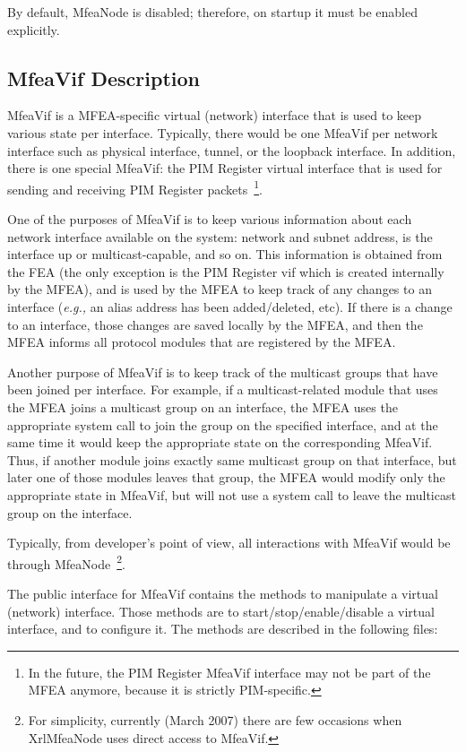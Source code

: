 \documentclass[11pt]{article}
\newcommand{\eg}{\emph{e.g.,}\xspace}
\begin{document}
By default, MfeaNode is disabled; therefore, on startup it must be
enabled explicitly.

\subsection{MfeaVif Description}

MfeaVif is a MFEA-specific virtual (network) interface that is used to keep
various state per interface. Typically, there would be one
MfeaVif per network interface such as physical
interface, tunnel, or the loopback interface. In addition, there is
one special MfeaVif: the PIM Register virtual
interface that is used for sending and receiving PIM Register
packets~\footnote{In the future, the PIM
Register MfeaVif interface may not be part of the MFEA anymore, because
it is strictly PIM-specific.}.

One of the purposes of MfeaVif is to keep various information about each
network interface available on the system: network and subnet address,
is the interface up or multicast-capable, and so on. This information is
obtained from the FEA (the only exception is the PIM Register vif which
is created internally by the MFEA), and is used by the MFEA to keep
track of any changes to an interface (\eg an alias address has been
added/deleted, etc). If there is a change to an interface, those changes
are saved locally by the MFEA, and then the MFEA informs all protocol
modules that are registered by the MFEA.

Another purpose of MfeaVif is to keep track of the multicast groups that
have been joined per interface. For example, if a multicast-related
module that uses the MFEA joins a multicast group on an interface, the
MFEA uses the appropriate system call to join the group on the
specified interface, and at the same time it would keep the appropriate
state on the corresponding MfeaVif. Thus, if another module joins
exactly same multicast group on that interface, but later one of
those modules leaves that group, the MFEA would modify only the appropriate
state in MfeaVif, but will not use a system call to leave the multicast
group on the interface.

Typically, from developer's point of view, all interactions with MfeaVif
would be through MfeaNode~\footnote{For simplicity, currently
(March 2007) there are few occasions when XrlMfeaNode uses direct access to
MfeaVif.}.

The public interface for MfeaVif contains the methods to manipulate a
virtual (network) interface. Those methods are to start/stop/enable/disable a
virtual interface, and to configure it. The methods are described in
the following files:
\end{document}

